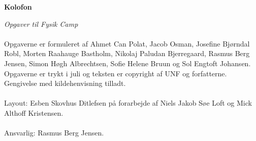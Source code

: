 \begin{center}
\textbf{Kolofon}
\end{center}
\textit{Opgaver til Fysik Camp \campyear}\\\\
Opgaverne er formuleret af Ahmet Can Polat, Jacob Osman, Josefine Bjørndal Robl, Morten Raahauge Bastholm, Nikolaj Paludan Bjerregaard, Rasmus Berg Jensen, Simon Høgh Albrechtsen, Sofie Helene Bruun og Sol Engtoft Johansen. Opgaverne er trykt i juli {\campyear} og teksten er copyright {\textcopyright} {\campyear} af UNF og forfatterne. Gengivelse med kildehenvisning tilladt. \\\\
  Layout: Esben Skovhus Ditlefsen på forarbejde af Niels Jakob Søe Loft og Mick Althoff Kristensen.\\\\
  Ansvarlig: Rasmus Berg Jensen.